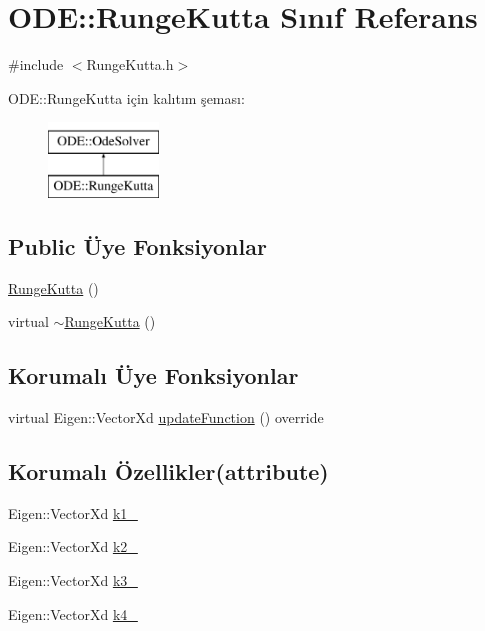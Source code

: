 \hypertarget{classODE_1_1RungeKutta}{}\section{O\+DE\+::Runge\+Kutta Sınıf Referans}
\label{classODE_1_1RungeKutta}


{\ttfamily \#include $<$Runge\+Kutta.\+h$>$}

O\+DE\+::Runge\+Kutta için kalıtım şeması\+:\begin{figure}[H]
\begin{center}
\leavevmode
\includegraphics[height=2.000000cm]{classODE_1_1RungeKutta}
\end{center}
\end{figure}
\subsection*{Public Üye Fonksiyonlar}
\begin{DoxyCompactItemize}
\item 
\mbox{\hyperlink{classODE_1_1RungeKutta_ae19a22749e715723cb1414ece5f7bd88}{Runge\+Kutta}} ()
\item 
virtual \mbox{\hyperlink{classODE_1_1RungeKutta_ac1514d8b68d46e1cc51dfa1f52003af0}{$\sim$\+Runge\+Kutta}} ()
\end{DoxyCompactItemize}
\subsection*{Korumalı Üye Fonksiyonlar}
\begin{DoxyCompactItemize}
\item 
virtual Eigen\+::\+Vector\+Xd \mbox{\hyperlink{classODE_1_1RungeKutta_a545126adbad4dcf9294cc2623117edab}{update\+Function}} () override
\end{DoxyCompactItemize}
\subsection*{Korumalı Özellikler(attribute)}
\begin{DoxyCompactItemize}
\item 
Eigen\+::\+Vector\+Xd \mbox{\hyperlink{classODE_1_1RungeKutta_ac19d5705a3f6b4bb3afc733cc3ae6e12}{k1\+\_\+}}
\item 
Eigen\+::\+Vector\+Xd \mbox{\hyperlink{classODE_1_1RungeKutta_a001c906e3a7ae731bf77e60a35b5258c}{k2\+\_\+}}
\item 
Eigen\+::\+Vector\+Xd \mbox{\hyperlink{classODE_1_1RungeKutta_a5231484792516296abbd6b14a63f25e4}{k3\+\_\+}}
\item 
Eigen\+::\+Vector\+Xd \mbox{\hyperlink{classODE_1_1RungeKutta_a1dc77bd2fb304d6c1d5d77894257f174}{k4\+\_\+}}
\end{DoxyCompactItemize}


